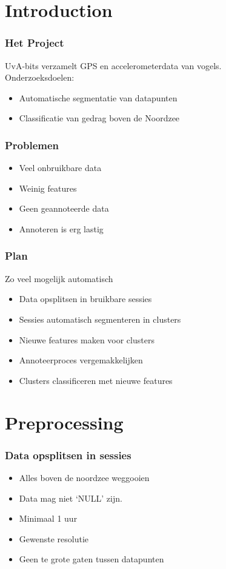 \documentclass{beamer}
\title{\projectName}
\subtitle{\projectAbbreviation}
\author{Jesse Eisses, Sosha Happel, Maarten Inja and Maarten de Waard}
\institute{UvA}
\newcommand{\slide}[2]
{
\begin{frame}
\frametitle{#1} 


#2

\end{frame}
}
\begin{document}
\begin{frame}
\titlepage
\end{frame}



\section{Introduction}
\slide{Het Project}
{
UvA-bits verzamelt GPS en accelerometerdata van vogels.\\
Onderzoeksdoelen:
\begin{itemize}
	\item Automatische segmentatie van datapunten
	\item Classificatie van gedrag boven de Noordzee
\end{itemize} 
}

\slide{Problemen}
{
\begin{itemize}
	\item Veel onbruikbare data
	\item Weinig features
	\item Geen geannoteerde data
	\item Annoteren is erg lastig
\end{itemize} 
}

\slide{Plan}
{
Zo veel mogelijk automatisch
\begin{itemize}
	\item Data opsplitsen in bruikbare sessies
	\item Sessies automatisch segmenteren in clusters
	\item Nieuwe features maken voor clusters
	\item Annoteerproces vergemakkelijken
	\item Clusters classificeren met nieuwe features
\end{itemize} 
}

\section{Preprocessing}
\slide{Data opsplitsen in sessies}
{
\begin{itemize}
    \item Alles boven de noordzee weggooien
    \item Data mag niet `NULL' zijn.
    \item Minimaal 1 uur
    \item Gewenste resolutie
    \item Geen te grote gaten tussen datapunten
\end{itemize}
}
\end{document}
